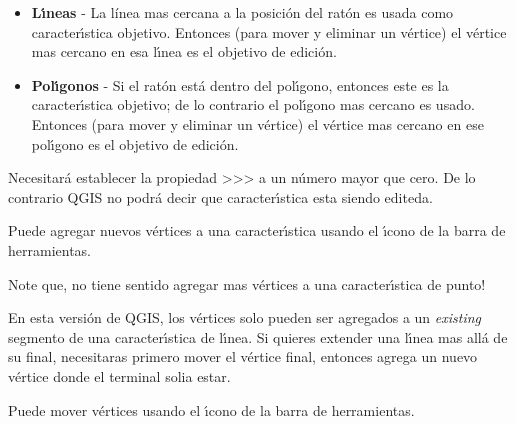 \begin{itemize}
\item \textbf{L\'{\i}neas}    - La l{\'i}nea mas cercana a la posici\'on del rat\'on
                          es usada como caracter\'{\i}stica objetivo.
                          Entonces (para mover y eliminar un v\'ertice)
                          el v\'ertice mas cercano
                          en esa l\'{\i}nea es el objetivo de edici\'on.

\item \textbf{Pol\'{\i}gonos} - Si el rat\'on est\'a dentro del pol\'{\i}gono, entonces este
                          es la caracter\'{\i}stica objetivo; de lo contrario el pol\'{\i}gono mas cercano
                          es usado.
                          Entonces (para mover y eliminar un v\'ertice)
                          el v\'ertice mas cercano
                          en ese pol\'{\i}gono es el objetivo de edici\'on.                          
\end{itemize}

Necesitar\'a establecer la propiedad
>>>
a un n\'umero mayor que cero.  De lo contrario QGIS no podr\'a decir que caracter\'{\i}stica esta siendo editeda.



Puede agregar nuevos v\'ertices a una caracter\'{\i}stica usando el \'{\i}cono
de la barra de herramientas.

Note que, no tiene sentido agregar mas v\'ertices a una caracter\'{\i}stica de punto!

En esta versi\'on de QGIS, los v\'ertices solo pueden ser agregados a un \textit{existing} segmento
de una caracter\'{\i}stica de l\'{\i}nea.  Si quieres extender una l\'{\i}nea mas all\'a de su final,
necesitaras primero mover el v\'ertice final, entonces agrega un nuevo v\'ertice donde
el terminal solia estar.


Puede mover v\'ertices usando el \'{\i}cono 
de la barra de herramientas.


